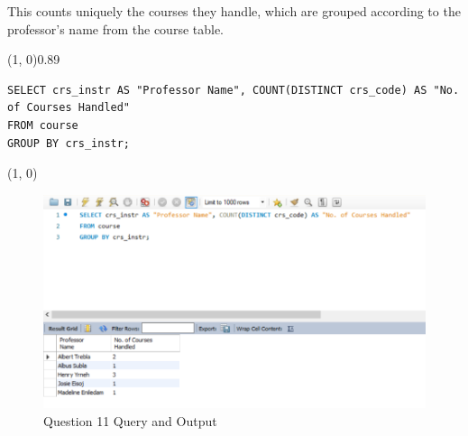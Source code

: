 
This counts uniquely the courses they handle, which are grouped according to the professor's name from the course table.
\vspace{\baselineskip}

\sol{}
\noindent\line(1, 0){0.89\linewidth}
\begin{verbatim}
SELECT crs_instr AS "Professor Name", COUNT(DISTINCT crs_code) AS "No. of Courses Handled"
FROM course
GROUP BY crs_instr;
\end{verbatim}
\noindent\line(1, 0){\linewidth}

\begin{figure}[H]
    \centering
    \includegraphics[width=0.7\linewidth]{images/q11.png}
    \caption{Question 11 Query and Output}
\end{figure}
